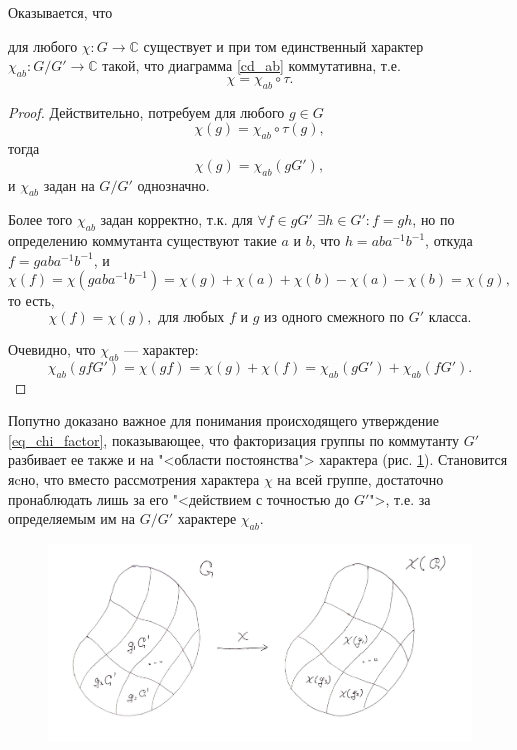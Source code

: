     Оказывается, что 
    \begin{statement} для любого $\chi : G \to \mathbb{C}$ существует и при том 
        единственный характер $\chi_{ab} : G/G' \to \mathbb{C}$ такой, что диаграмма 
        \eqref{cd_ab} коммутативна, т.е. 
        \[\chi = \chi_{ab} \circ \tau.\]
    \end{statement}

    \begin{proof} Действительно, потребуем для любого $g \in G$
    \[\chi(g) = \chi_{ab} \circ \tau (g),\]
    тогда
    \[\chi(g) = \chi_{ab} (gG'),\]
    и $\chi_{ab}$ задан на $G/G'$ однозначно.

    Более того $\chi_{ab}$ задан корректно, т.к. для $\forall f \in gG'$ 
    $\exists h \in G': f = gh$, но по определению коммутанта существуют такие 
    $a$ и $b$, что $h = aba^{-1}b^{-1}$, откуда $f = gaba^{-1}b^{-1}$, и 
    \[\chi(f) = \chi(gaba^{-1}b^{-1}) 
    = \chi(g) + \chi(a) + \chi(b) - \chi(a) - \chi(b) = \chi(g),\]
    то есть,
    \begin{equation}\label{eq_chi_factor}
        \chi(f) = \chi(g),\text{ для любых $f$ и $g$ из одного смежного по $G'$ класса.}
    \end{equation}
    
    Очевидно, что $\chi_{ab}$ --- характер:
    \[\chi_{ab}(gf G') = \chi(gf) = \chi(g) + \chi(f) = \chi_{ab}(gG') + \chi_{ab}(fG').\]
    \end{proof}
    
    \begin{remark} Попутно доказано важное для понимания происходящего 
        утверждение \eqref{eq_chi_factor}, показывающее, что факторизация 
        группы по коммутанту $G'$ разбивает ее также и на "<области постоянства"> 
        характера (рис. \ref{img_chi_factor}). Становится яcно, что вместо 
        рассмотрения характера $\chi$ на всей группе, достаточно пронаблюдать 
        лишь за его "<действием с точностью до $G'$">, т.е. за определяемым им 
        на $G/G'$ характере $\chi_{ab}$.
    \end{remark}
    
    \begin{figure}[th]
        \centering
        \includegraphics[width=\textwidth]{pictures/chips}
        \caption{}
        \label{img_chi_factor}
    \end{figure}


